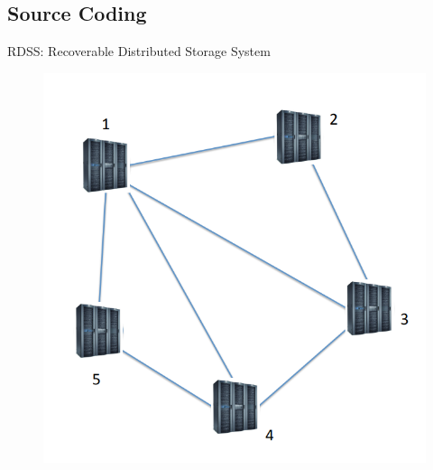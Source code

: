 \documentclass[xcolor=dvipsnames, aspectratio=169]{beamer}
\begin{document}
\subsection{Source Coding}
\begin{frame}{RDSS: Recoverable Distributed Storage System}
	\begin{figure}
		\centering
		\includegraphics[width=0.5\linewidth]{img/aryaaa}
		\label{fig:aryaaa}
	\end{figure}
	
\end{frame}
\end{document}

